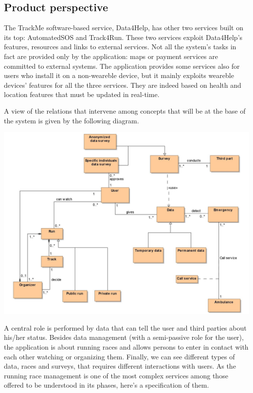 
%

\subsection{Product perspective}
The TrackMe software-based service, Data4Help, has  other two services built on its top: AutomatedSOS and Track4Run. These two services exploit Data4Help's features, resources and links to external services. Not all the system's tasks in fact are provided only by the application: maps or payment services are committed to external systems. The application provides some services also for users who install it on a non-weareble device, but it mainly exploits weareble devices' features for all the three services. They are indeed based on health and location features that must be updated in real-time. \newline

A view of the relations that intervene among concepts that will be at the base of the system is given by the following diagram. \newline

\begin{center}
\includegraphics[scale=1]{sections/diagrams/class_diagram.jpg}
\end{center}

A central role is performed by data that can tell the user and third parties about his/her status. Besides data management (with a semi-passive role for the user), the application is about running races and allows persons to enter in contact with each other watching or organizing them. Finally, we can see different types of data, races and surveys, that requires different interactions with users. \newpage
As the running race management is one of the most complex services among those offered to be understood in its phases, here's a specification of them.

